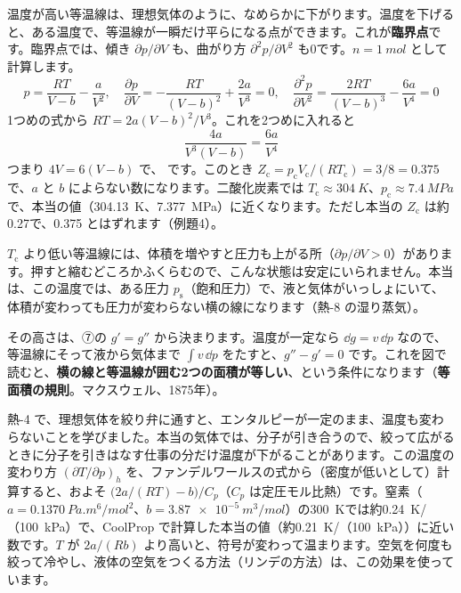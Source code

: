 温度が高い等温線は、理想気体のように、なめらかに下がります。温度を下げると、ある温度で、等温線が一瞬だけ平らになる点ができます。これが\textbf{臨界点}です。臨界点では、傾き $\partial p/\partial V$ も、曲がり方 $\partial^2p/\partial V^2$ も0です。$n=\qty{1}{mol}$ として計算します。
\[p=\frac{RT}{V-b}-\frac{a}{V^2},\quad\frac{\partial p}{\partial V}=-\frac{RT}{(V-b)^2}+\frac{2a}{V^3}=0,\quad\frac{\partial^2p}{\partial V^2}=\frac{2RT}{(V-b)^3}-\frac{6a}{V^4}=0\]
1つめの式から $RT=2a(V-b)^2/V^3$。これを2つめに入れると
\[\frac{4a}{V^3(V-b)}=\frac{6a}{V^4}\]
つまり $4V=6(V-b)$ で、
です。このとき $Z_{\mathrm c}=p_{\mathrm c}V_{\mathrm c}/(RT_{\mathrm c})=3/8=0.375$ で、$a$ と $b$ によらない数になります。二酸化炭素では $T_{\mathrm c}\approx\qty{304}{K}$、$p_{\mathrm c}\approx\qty{7.4}{MPa}$ で、本当の値（\qty{304.13}{K}、\qty{7.377}{MPa}）に近くなります。ただし本当の $Z_{\mathrm c}$ は約0.27で、0.375 とはずれます（例題4）。

$T_{\mathrm c}$ より低い等温線には、体積を増やすと圧力も上がる所（$\partial p/\partial V>0$）があります。押すと縮むどころかふくらむので、こんな状態は安定にいられません。本当は、この温度では、ある圧力 $p_{\mathrm s}$（飽和圧力）で、液と気体がいっしょにいて、体積が変わっても圧力が変わらない横の線になります（熱-8 の湿り蒸気）。

その高さは、⑦の $g'=g''$ から決まります。温度が一定なら $\dd g=v\,\dd p$ なので、等温線にそって液から気体まで $\int v\,\dd p$ をたすと、$g''-g'=0$ です。これを図で読むと、\textbf{横の線と等温線が囲む2つの面積が等しい}、という条件になります（\textbf{等面積の規則}。マクスウェル、1875年）。

\begin{motto}[5]
熱-4 で、理想気体を絞り弁に通すと、エンタルピーが一定のまま、温度も変わらないことを学びました。本当の気体では、分子が引き合うので、絞って広がるときに分子を引きはなす仕事の分だけ温度が下がることがあります。この温度の変わり方 $(\partial T/\partial p)_h$ を、ファンデルワールスの式から（密度が低いとして）計算すると、およそ $\bigl(2a/(RT)-b\bigr)/C_{p}$（$C_p$ は定圧モル比熱）です。窒素（$a=\qty{0.1370}{Pa.m^6/mol^2}$、$b=\qty{3.87e-5}{m^3/mol}$）の\qty{300}{K}では約\qty{0.24}{K}/（\qty{100}{kPa}）で、CoolProp で計算した本当の値（約\qty{0.21}{K}/（\qty{100}{kPa}））に近い数です。$T$ が $2a/(Rb)$ より高いと、符号が変わって温まります。空気を何度も絞って冷やし、液体の空気をつくる方法（リンデの方法）は、この効果を使っています。
\end{motto}

